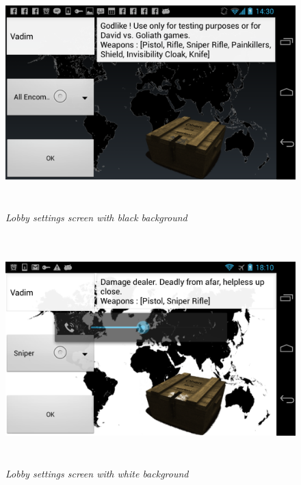 \documentclass{article}
\begin{document}
\begin{enumerate}
  \begin{figure}
  \includegraphics[height=3.5in,width=6.23in]{./images/android_screenshots/second_development/game_second_development_8.png}
  \caption{\small \sl Lobby settings screen with black background
  \label{fig:lobby_settings_background_black}}
  \end{figure}

  \begin{figure}
  \includegraphics[height=3.5in,width=6.23in]{./images/android_screenshots/lobby_settings_background_white.png}
  \caption{\small \sl Lobby settings screen with white background
  \label{fig:lobby_settings_background_white}}
  \end{figure}
  
\end{enumerate}
\end{document}

